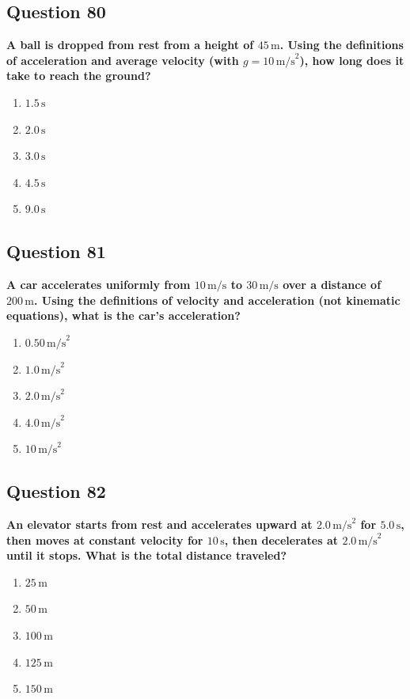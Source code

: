 \documentclass[12pt,letterpaper]{article}
\begin{document}
\subsection{Question 80}

\begin{questionbox}
\textbf{A ball is dropped from rest from a height of $45\,\text{m}$. Using the definitions of acceleration and average velocity (with $g = 10\,\text{m/s}^2$), how long does it take to reach the ground?}

\begin{enumerate}[label=\alph*)]
    \item $1.5\,\text{s}$
    \item $2.0\,\text{s}$
    \item $3.0\,\text{s}$
    \item $4.5\,\text{s}$
    \item $9.0\,\text{s}$
\end{enumerate}
\end{questionbox}

\subsection{Question 81}

\begin{questionbox}
\textbf{A car accelerates uniformly from $10\,\text{m/s}$ to $30\,\text{m/s}$ over a distance of $200\,\text{m}$. Using the definitions of velocity and acceleration (not kinematic equations), what is the car's acceleration?}

\begin{enumerate}[label=\alph*)]
    \item $0.50\,\text{m/s}^2$
    \item $1.0\,\text{m/s}^2$
    \item $2.0\,\text{m/s}^2$
    \item $4.0\,\text{m/s}^2$
    \item $10\,\text{m/s}^2$
\end{enumerate}
\end{questionbox}

\subsection{Question 82}

\begin{questionbox}
\textbf{An elevator starts from rest and accelerates upward at $2.0\,\text{m/s}^2$ for $5.0\,\text{s}$, then moves at constant velocity for $10\,\text{s}$, then decelerates at $2.0\,\text{m/s}^2$ until it stops. What is the total distance traveled?}

\begin{enumerate}[label=\alph*)]
    \item $25\,\text{m}$
    \item $50\,\text{m}$
    \item $100\,\text{m}$
    \item $125\,\text{m}$
    \item $150\,\text{m}$
\end{enumerate}
\end{questionbox}
\end{document}
